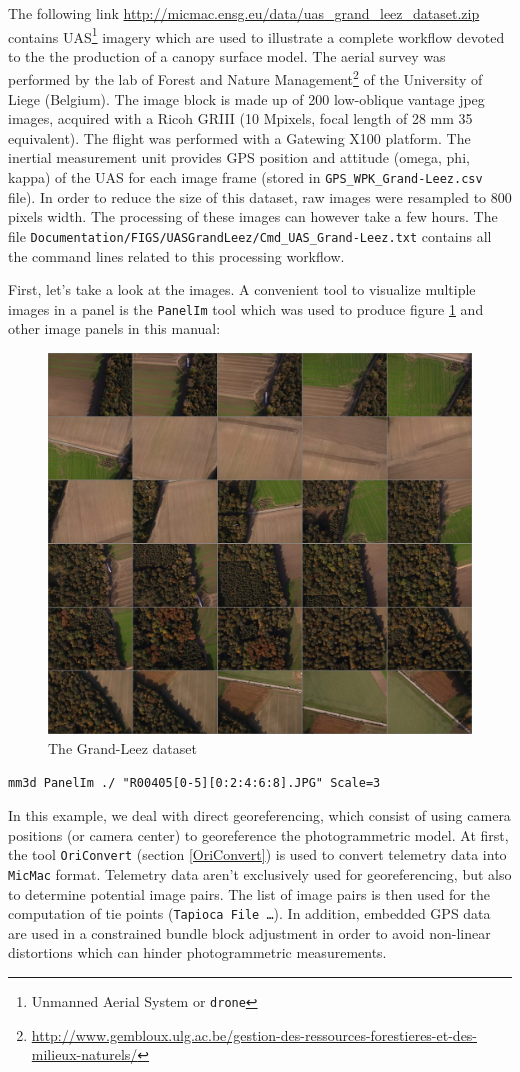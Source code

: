 The following link \url{http://micmac.ensg.eu/data/uas_grand_leez_dataset.zip} contains UAS\footnote{Unmanned Aerial System or {\tt drone}} imagery which are used to illustrate a complete workflow devoted to the the production of a canopy surface model. 
The aerial survey was performed by the lab of Forest and Nature Management\footnote{\url{http://www.gembloux.ulg.ac.be/gestion-des-ressources-forestieres-et-des-milieux-naturels/}} of the University of Liege (Belgium). 
The image block is made up of 200 low-oblique vantage jpeg images, acquired with a Ricoh GRIII (10 Mpixels, focal length of 28 mm 35 equivalent). 
The flight was performed with a Gatewing X100 platform.
The inertial measurement unit provides GPS position and attitude (omega, phi, kappa) of the UAS for each image frame (stored in {\tt GPS\_WPK\_Grand-Leez.csv} file). 
In order to reduce the size of this dataset, raw images were resampled to 800 pixels width. 
The processing of these images can however take a few hours. 
The file {\tt  Documentation/FIGS/UASGrandLeez/Cmd\_UAS\_Grand-Leez.txt} contains all the command lines related to this processing workflow.

First, let's take a look at the images. 
A convenient tool to visualize multiple images in a panel is the {\tt PanelIm} tool which was used to produce figure \ref{FIG:panel-GL} and other image panels in this manual:

\begin{figure}[H]
\centering
\includegraphics[height=0.5\linewidth]{FIGS/UASGrandLeez/PanelGL.JPG}
\caption{The Grand-Leez dataset}
\label{FIG:panel-GL}
\end{figure}

\begin{verbatim}
mm3d PanelIm ./ "R00405[0-5][0:2:4:6:8].JPG" Scale=3
\end{verbatim}

In this example, we deal with direct georeferencing, which consist of using camera positions (or camera center) to georeference the photogrammetric model. 
At first, the tool {\tt OriConvert} (section \ref{OriConvert})  is used to convert telemetry data into {\tt MicMac} format. 
Telemetry data aren't exclusively used for georeferencing, but also to determine potential image pairs.
The list of image pairs is then used for the computation of tie points ({\tt Tapioca File \dots}). 
In addition, embedded GPS data are used in a constrained bundle block adjustment in order to avoid non-linear distortions which can hinder photogrammetric measurements.

